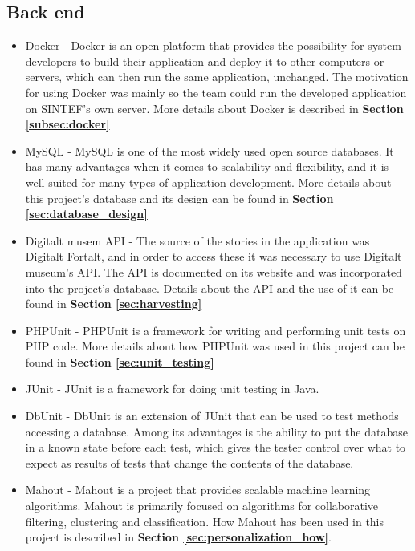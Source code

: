 \subsection{Back end}
\begin{itemize}
	\item Docker \cite{EHW2} - Docker is an open platform that provides the possibility for system developers to build their application and deploy it to other computers or servers, which can then run the same application, unchanged. The motivation for using Docker was mainly so the team could run the developed application on SINTEF's own server. More details about Docker is described in \textbf{Section \ref{subsec:docker}}
	\item MySQL \cite{es8} - MySQL is one of the most widely used open source databases. It has many advantages when it comes to scalability and flexibility, and it is well suited for many types of application development. More details about this project's database and its design can be found in \textbf{Section \ref{sec:database_design}}
	\item Digitalt musem API \cite{digitaltMuseum} - The source of the stories in the application was Digitalt Fortalt, and in order to access these it was necessary to use Digitalt museum's API. The API is documented on its website and was incorporated into the project's database. Details about the API and the use of it can be found in \textbf{Section \ref{sec:harvesting}}
	\item PHPUnit \cite{KF2} - PHPUnit is a framework for writing and performing unit tests on PHP code. More details about how PHPUnit was used in this project can be found in \textbf{Section \ref{sec:unit_testing}}
	\item JUnit \cite{jUnit} - JUnit is a framework for doing unit testing in Java. 
	\item DbUnit \cite{dbUnit} - DbUnit is an extension of JUnit that can be used to test methods accessing a database. Among its advantages is the ability to put the database in a known state before each test, which gives the tester control over what to expect as results of tests that change the contents of the database.
	\item Mahout \cite{as9}  - Mahout is a project that provides scalable machine learning algorithms. Mahout is primarily focused on algorithms for collaborative filtering, clustering and classification. How Mahout has been used in this project is described in \textbf{Section \ref{sec:personalization_how}}.
\end{itemize}

